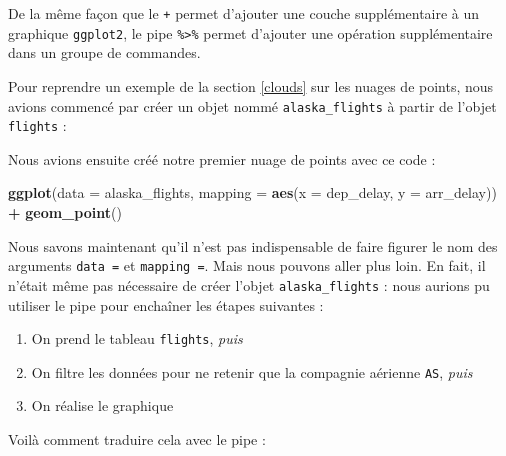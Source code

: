 \documentclass[a4paperpaper,]{article}
\newenvironment{Shaded}{\begin{snugshade}}{\end{snugshade}}
\newcommand{\KeywordTok}[1]{\textcolor[rgb]{0.13,0.29,0.53}{\textbf{#1}}}
\newcommand{\DataTypeTok}[1]{\textcolor[rgb]{0.13,0.29,0.53}{#1}}
\newcommand{\StringTok}[1]{\textcolor[rgb]{0.31,0.60,0.02}{#1}}
\newcommand{\OperatorTok}[1]{\textcolor[rgb]{0.81,0.36,0.00}{\textbf{#1}}}
\newcommand{\NormalTok}[1]{#1}
\providecommand{\tightlist}{%
  \setlength{\itemsep}{0pt}\setlength{\parskip}{0pt}}
\theoremstyle{definition}
\theoremstyle{definition}
\theoremstyle{definition}
\theoremstyle{remark}
\begin{document}
De la même façon que le \texttt{+} permet d'ajouter une couche
supplémentaire à un graphique \texttt{ggplot2}, le pipe
\texttt{\%\textgreater{}\%} permet d'ajouter une opération
supplémentaire dans un groupe de commandes.

Pour reprendre un exemple de la section \ref{clouds} sur les nuages de
points, nous avions commencé par créer un objet nommé
\texttt{alaska\_flights} à partir de l'objet \texttt{flights} :

\begin{Shaded}
\end{Shaded}

Nous avions ensuite créé notre premier nuage de points avec ce code :

\begin{Shaded}
\begin{Highlighting}[]
\KeywordTok{ggplot}\NormalTok{(}\DataTypeTok{data =}\NormalTok{ alaska_flights, }\DataTypeTok{mapping =} \KeywordTok{aes}\NormalTok{(}\DataTypeTok{x =}\NormalTok{ dep_delay, }\DataTypeTok{y =}\NormalTok{ arr_delay)) }\OperatorTok{+}\StringTok{ }
\StringTok{  }\KeywordTok{geom_point}\NormalTok{()}
\end{Highlighting}
\end{Shaded}

Nous savons maintenant qu'il n'est pas indispensable de faire figurer le
nom des arguments \texttt{data\ =} et \texttt{mapping\ =}. Mais nous
pouvons aller plus loin. En fait, il n'était même pas nécessaire de
créer l'objet \texttt{alaska\_flights} : nous aurions pu utiliser le
pipe pour enchaîner les étapes suivantes :

\begin{enumerate}
\def\labelenumi{\arabic{enumi}.}
\tightlist
\item
  On prend le tableau \texttt{flights}, \emph{puis}
\item
  On filtre les données pour ne retenir que la compagnie aérienne
  \texttt{AS}, \emph{puis}
\item
  On réalise le graphique
\end{enumerate}

Voilà comment traduire cela avec le pipe :

\begin{Shaded}
\end{Shaded}
\end{document}
